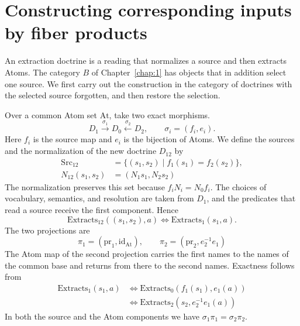 \section{Constructing corresponding inputs by fiber products}\label{sec:5.1}

An extraction doctrine is a reading that normalizes a source and then extracts Atoms. The
category $B$ of Chapter~\ref{chap:1} has objects that in addition select one source. We first
carry out the construction in the category of doctrines with the selected source forgotten,
and then restore the selection.

\begin{construction}\label{cons:5.1}

Over a common Atom set $\mathrm{At}$, take two exact morphisms.
\begin{equation*}
D_1\xrightarrow{\sigma_1}D_0\xleftarrow{\sigma_2}D_2,
\qquad \sigma_i=(f_i,e_i).
\tag{5.1}\label{eq:5.1}
\end{equation*}
Here $f_i$ is the source map and $e_i$ is the bijection of Atoms. We define the sources and
the normalization of the new doctrine $D_{12}$ by
\begin{equation*}
\begin{aligned}
\mathrm{Src}_{12}
 &=\{(s_1,s_2)\mid f_1(s_1)=f_2(s_2)\},\\
N_{12}(s_1,s_2)&=(N_1s_1,N_2s_2)
\end{aligned}
\tag{5.2}\label{eq:5.2}
\end{equation*}
The normalization preserves this set because $f_iN_i=N_0f_i$. The choices of vocabulary,
semantics, and resolution are taken from $D_1$, and the predicates that read a source receive
the first component. Hence
\begin{equation*}
\mathrm{Extracts}_{12}((s_1,s_2),a)
\Longleftrightarrow \mathrm{Extracts}_1(s_1,a).
\tag{5.3}\label{eq:5.3}
\end{equation*}
The two projections are
\begin{equation*}
\pi_1=(\mathrm{pr}_1,\mathrm{id}_{\mathrm{At}}),
\qquad
\pi_2=(\mathrm{pr}_2,e_2^{-1}e_1)
\tag{5.4}\label{eq:5.4}
\end{equation*}
The Atom map of the second projection carries the first names to the names of the common base
and returns from there to the second names. Exactness follows from
\begin{equation*}
\begin{aligned}
\mathrm{Extracts}_1(s_1,a)
&\Longleftrightarrow\mathrm{Extracts}_0(f_1(s_1),e_1(a))\\
&\Longleftrightarrow\mathrm{Extracts}_2(s_2,e_2^{-1}e_1(a))
\end{aligned}
\tag{5.5}\label{eq:5.5}
\end{equation*}
In both the source and the Atom components we have $\sigma_1\pi_1=\sigma_2\pi_2$.

\end{construction}


